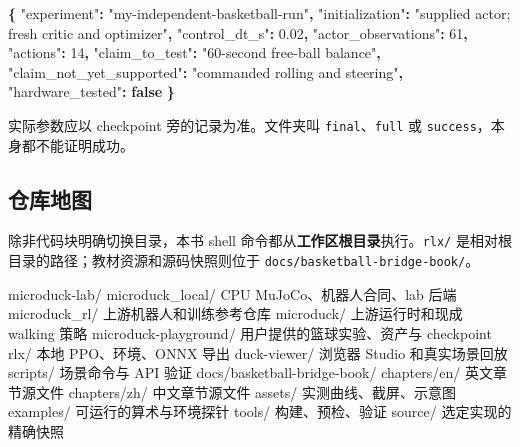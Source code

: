\documentclass[
  chinese,
  11pt,
  letterpaper,
]{article}
\newenvironment{Shaded}{\begin{snugshade}}{\end{snugshade}}
\newcommand{\DataTypeTok}[1]{\textcolor[rgb]{0.13,0.29,0.53}{#1}}
\newcommand{\DecValTok}[1]{\textcolor[rgb]{0.00,0.00,0.81}{#1}}
\newcommand{\FloatTok}[1]{\textcolor[rgb]{0.00,0.00,0.81}{#1}}
\newcommand{\FunctionTok}[1]{\textcolor[rgb]{0.13,0.29,0.53}{\textbf{#1}}}
\newcommand{\KeywordTok}[1]{\textcolor[rgb]{0.13,0.29,0.53}{\textbf{#1}}}
\newcommand{\NormalTok}[1]{#1}
\newcommand{\StringTok}[1]{\textcolor[rgb]{0.31,0.60,0.02}{#1}}
\renewenvironment{Shaded}{\par\smallskip}{\par\smallskip}
\begin{document}
\begin{Shaded}
\begin{Highlighting}[]
\FunctionTok{\{}
  \DataTypeTok{"experiment"}\FunctionTok{:} \StringTok{"my{-}independent{-}basketball{-}run"}\FunctionTok{,}
  \DataTypeTok{"initialization"}\FunctionTok{:} \StringTok{"supplied actor; fresh critic and optimizer"}\FunctionTok{,}
  \DataTypeTok{"control\_dt\_s"}\FunctionTok{:} \FloatTok{0.02}\FunctionTok{,}
  \DataTypeTok{"actor\_observations"}\FunctionTok{:} \DecValTok{61}\FunctionTok{,}
  \DataTypeTok{"actions"}\FunctionTok{:} \DecValTok{14}\FunctionTok{,}
  \DataTypeTok{"claim\_to\_test"}\FunctionTok{:} \StringTok{"60{-}second free{-}ball balance"}\FunctionTok{,}
  \DataTypeTok{"claim\_not\_yet\_supported"}\FunctionTok{:} \StringTok{"commanded rolling and steering"}\FunctionTok{,}
  \DataTypeTok{"hardware\_tested"}\FunctionTok{:} \KeywordTok{false}
\FunctionTok{\}}
\end{Highlighting}
\end{Shaded}

实际参数应以 checkpoint 旁的记录为准。文件夹叫
\texttt{final}、\texttt{full} 或 \texttt{success}，本身都不能证明成功。

\subsection{仓库地图}\label{ux4ed3ux5e93ux5730ux56fe}

除非代码块明确切换目录，本书 shell
命令都从\textbf{工作区根目录}执行。\texttt{rlx/}
是相对根目录的路径；教材资源和源码快照则位于
\texttt{docs/\allowbreak{}basketba\allowbreak{}ll-\allowbreak{}bridge-\allowbreak{}book/\allowbreak{}}。

\begingroup\setmonofont{PingFang SC}

\begin{Shaded}
\begin{Highlighting}[]
\NormalTok{microduck{-}lab/}
\NormalTok{  microduck\_local/       CPU MuJoCo、机器人合同、lab 后端}
\NormalTok{  microduck\_rl/          上游机器人和训练参考仓库}
\NormalTok{  microduck/             上游运行时和现成 walking 策略}
\NormalTok{  microduck{-}playground/  用户提供的篮球实验、资产与 checkpoint}
\NormalTok{  rlx/                  本地 PPO、环境、ONNX 导出}
\NormalTok{  duck{-}viewer/           浏览器 Studio 和真实场景回放}
\NormalTok{  scripts/              场景命令与 API 验证}
\NormalTok{  docs/basketball{-}bridge{-}book/}
\NormalTok{    chapters/en/        英文章节源文件}
\NormalTok{    chapters/zh/        中文章节源文件}
\NormalTok{    assets/             实测曲线、截屏、示意图}
\NormalTok{    examples/           可运行的算术与环境探针}
\NormalTok{    tools/              构建、预检、验证}
\NormalTok{    source/             选定实现的精确快照}
\end{Highlighting}
\end{Shaded}
\end{document}

